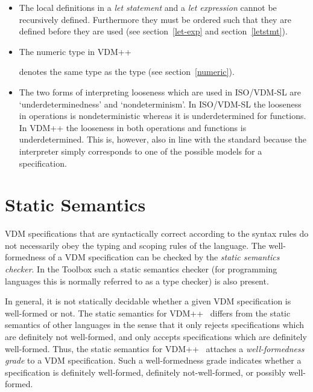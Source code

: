 \documentclass[\pformat,12pt]{article}
\newcommand{\vdmslpp}[2]{%
#2
}
\newcommand{\vdmsl}{VDM-SL}
\newcommand{\vdmpp}{VDM++}
\begin{document}
\begin{description}
\begin{itemize}
  \item The local definitions in a {\it let statement\/} and a {\it
    let expression\/} cannot be recursively defined. Furthermore they
    must be ordered such that they are defined before they are used
    (see section~\ref{let-exp} and section~\ref{letstmt}).
    
  \item The numeric type  in  \vdmslpp{\vdmsl}{\vdmpp}
    denotes the same type as the type  (see
    section~\ref{numeric}).
      
  \item The two forms of interpreting looseness which are used in
    ISO/VDM-SL are `underdeterminedness' and `nondeterminism'. In
    ISO/VDM-SL the looseness in operations is nondeterministic whereas
    it is underdetermined for functions. In 
    \vdmslpp{\vdmsl}{\vdmpp} the looseness in both operations and
    functions is underdetermined. This is, however, also in line with
    the standard because the interpreter simply corresponds to one of
    the possible models for a specification.

  \end{itemize}
\end{description}

\section{Static Semantics}\label{static}

VDM specifications that are syntactically correct according to the
syntax rules do not necessarily obey the
typing and scoping rules of the language.
The well-formedness of a
VDM specification can be checked by the {\em static semantics checker}.
In the Toolbox such a static semantics checker (for programming
languages this is normally referred to as a type checker) is also
present.

In general, it is not statically decidable whether a given VDM
specification is well-formed or not.  The static semantics for
\vdmslpp{\vdmsl}{\vdmpp}\ differs from the static semantics of other
languages in the sense that it only rejects specifications which are
definitely not well-formed, and only accepts specifications which are
definitely well-formed.  Thus, the static semantics for
\vdmslpp{\vdmsl}{\vdmpp}\ attaches a {\em well-formedness grade} to a
VDM specification.  Such a well-formedness grade indicates whether a
specification is definitely well-formed, definitely not-well-formed, or
possibly well-formed.
\end{document}
